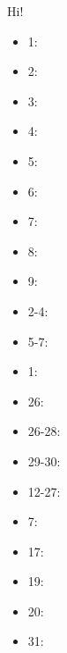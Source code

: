 \documentclass{ifacconf}
\begin{document}
Hi!
\begin{itemize}
    \item 1: \cite{bi:01}
    \item 2: \cite{bi:02}
    \item 3: \cite{bi:03}
    \item 4: \cite{bi:04}
    \item 5: \cite{bi:05}
    \item 6: \cite{bi:06}
    \item 7: \cite{bi:07}
    \item 8: \cite{bi:08}
    \item 9: \cite{bi:09}
    \item 2-4: \cite{bi:02,bi:03,bi:04}
    \item 5-7: \cite{bi:05,bi:06,bi:07}
    \item 1: \cite{bix:01x}
    \item 26:\cite{bix:26}
    \item 26-28:\cite{bix:26,bix:27,bix:28}
    \item 29-30:\cite{bix:29,bix:30}
    \item 12-27: \cite{bix:12, bix:27}
    \item 7: \cite{biz:07}
    \item 17: \cite{biz:17}
    \item 19: \cite{biz:19}
    \item 20: \cite{biz:20}
    \item 31: \cite{biz:31}
\end{itemize}

\nocite{*}
\end{document}
